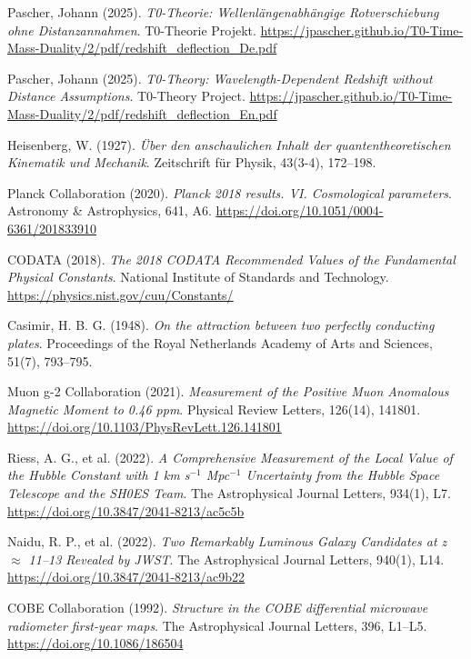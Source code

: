 \documentclass[12pt,a4paper]{article}
\begin{document}
\begin{thebibliography}{20}
		Pascher, Johann (2025). 
		\textit{T0-Theorie: Wellenlängenabhängige Rotverschiebung ohne Distanzannahmen}. 
		T0-Theorie Projekt. 
		\url{https://jpascher.github.io/T0-Time-Mass-Duality/2/pdf/redshift_deflection_De.pdf}
		
		Pascher, Johann (2025). 
		\textit{T0-Theory: Wavelength-Dependent Redshift without Distance Assumptions}. 
		T0-Theory Project. 
		\url{https://jpascher.github.io/T0-Time-Mass-Duality/2/pdf/redshift_deflection_En.pdf}
		
		Heisenberg, W. (1927). 
		\textit{\"Uber den anschaulichen Inhalt der quantentheoretischen Kinematik und Mechanik}. 
		Zeitschrift f\"ur Physik, 43(3-4), 172--198.
		
		Planck Collaboration (2020). 
		\textit{Planck 2018 results. VI. Cosmological parameters}. 
		Astronomy \& Astrophysics, 641, A6. 
		\url{https://doi.org/10.1051/0004-6361/201833910}
		
		CODATA (2018). 
		\textit{The 2018 CODATA Recommended Values of the Fundamental Physical Constants}. 
		National Institute of Standards and Technology. 
		\url{https://physics.nist.gov/cuu/Constants/}
		
		Casimir, H. B. G. (1948). 
		\textit{On the attraction between two perfectly conducting plates}. 
		Proceedings of the Royal Netherlands Academy of Arts and Sciences, 51(7), 793--795.
		
		Muon g-2 Collaboration (2021). 
		\textit{Measurement of the Positive Muon Anomalous Magnetic Moment to 0.46 ppm}. 
		Physical Review Letters, 126(14), 141801. 
		\url{https://doi.org/10.1103/PhysRevLett.126.141801}
		
		Riess, A. G., et al. (2022). 
		\textit{A Comprehensive Measurement of the Local Value of the Hubble Constant with 1 km s$^{-1}$ Mpc$^{-1}$ Uncertainty from the Hubble Space Telescope and the SH0ES Team}. 
		The Astrophysical Journal Letters, 934(1), L7. 
		\url{https://doi.org/10.3847/2041-8213/ac5c5b}
		
		Naidu, R. P., et al. (2022). 
		\textit{Two Remarkably Luminous Galaxy Candidates at z $\approx$ 11--13 Revealed by JWST}. 
		The Astrophysical Journal Letters, 940(1), L14. 
		\url{https://doi.org/10.3847/2041-8213/ac9b22}
		
		COBE Collaboration (1992). 
		\textit{Structure in the COBE differential microwave radiometer first-year maps}. 
		The Astrophysical Journal Letters, 396, L1--L5. 
		\url{https://doi.org/10.1086/186504}
		

\end{thebibliography}
\end{document}
